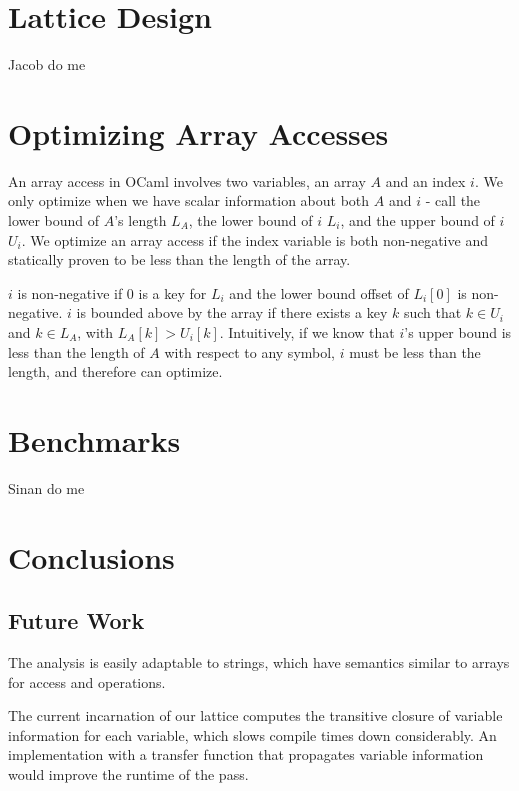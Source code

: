 \documentclass[11pt]{article}
\begin{document}
\section{Lattice Design}

Jacob do me

\section{Optimizing Array Accesses}

An array access in OCaml involves two variables, an array $A$ and an index $i$. We only optimize when we have scalar information about both $A$ and $i$ - call the lower bound of $A$'s length $L_A$, the lower bound of $i$ $L_i$, and the upper bound of $i$ $U_i$. We optimize an array access if the index variable is both non-negative and statically proven to be less than the length of the array.

$i$ is non-negative if $0$ is a key for $L_i$ and the lower bound offset of $L_i[0]$ is non-negative. $i$ is bounded above by the array if there exists a key $k$ such that $k \in U_i$ and $k \in L_A$, with $L_A[k] > U_i[k]$. Intuitively, if we know that $i$'s upper bound is less than the length of $A$ with respect to any symbol, $i$ must be less than the length, and therefore can optimize.


\section{Benchmarks}

Sinan do me

\section{Conclusions}



\subsection{Future Work}

The analysis is easily adaptable to strings, which have semantics similar to
arrays for access and operations. 

The current incarnation of our lattice computes the transitive closure of
variable information for each variable, which slows compile times down considerably.
An implementation with a transfer function that propagates variable information would
improve the runtime of the pass.
\end{document}
